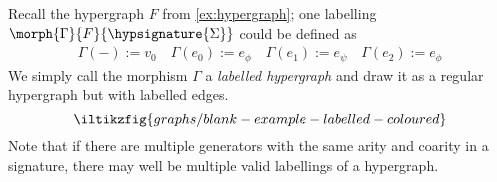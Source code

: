 \begin{example}
    Recall the hypergraph \(F\) from \autoref{ex:hypergraph}; one labelling
    \(\morph{\Gamma}{F}{\hypsignature{\Sigma}}\) could be defined as
    \begin{gather*}
        \Gamma(-) := v_0
        \quad
        \Gamma(e_0) := e_\phi
        \quad
        \Gamma(e_1) := e_\psi
        \quad
        \Gamma(e_2) := e_\phi
    \end{gather*}
    We simply call the morphism \(\Gamma\) a \emph{labelled hypergraph} and
    draw it as a regular hypergraph but with labelled edges.
    \[
        \iltikzfig{graphs/blank-example-labelled-coloured}
    \]
    Note that if there are multiple generators with the same arity and coarity
    in a signature, there may well be multiple valid labellings of a hypergraph.
\end{example}